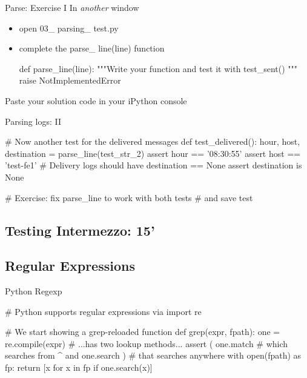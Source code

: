 \begin{frame}[fragile]{Parse: Exercise I }
In \emph{another} window
\begin{itemize}
\item open 03\_ parsing\_ test.py
\item complete the parse\_ line(line) function
\begin{pythoncode}
def parse_line(line):
    """Write your function and test it
        with test_sent()
    """
    raise NotImplementedError
\end{pythoncode}
\end{itemize}
Paste your solution code in your iPython console
\end{frame}


\begin{frame}[fragile]{Parsing logs: II}
\begin{pythoncode}
# Now another test for the delivered messages
def test_delivered():
    hour, host, destination = parse_line(test_str_2)
    assert hour == '08:30:55'
    assert host == 'test-fe1'
    # Delivery logs should have destination == None
    assert destination is None

# Exercise: fix parse_line to work with both tests
#  and save test
\end{pythoncode}
\end{frame}

\subsection{Testing Intermezzo: 15'}



\subsection{Regular Expressions}

\begin{frame}[fragile]{Python Regexp}
\begin{pythoncode}
# Python supports regular expressions via
import re

# We start showing a grep-reloaded function
def grep(expr, fpath):
    one = re.compile(expr) 
    # ...has two lookup methods...
    assert ( one.match    # which searches from ^
         and one.search ) # that searches anywhere
    with open(fpath) as fp:
        return [x for x in fp if one.search(x)]

\end{pythoncode}
\end{frame}

